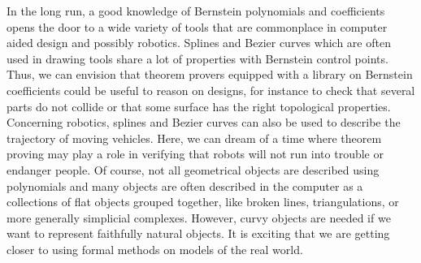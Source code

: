 \documentclass{mscs}
\begin{document}
In the long run, a good knowledge of Bernstein polynomials and
coefficients opens the door to a wide variety of tools that are
commonplace in computer aided design and possibly robotics. Splines
and Bezier curves which are often used in drawing tools share a lot of
properties with Bernstein control points. Thus, we can envision that
theorem provers equipped with a library on Bernstein coefficients
could be useful to reason on designs, for instance to check that
several parts do not collide or that some surface has the right
topological properties. Concerning robotics, splines and Bezier curves
can also be used to describe the trajectory of moving vehicles. Here,
we can dream of a time where theorem proving may play a role in
verifying that robots will not run into trouble or endanger people. Of
course, not all geometrical objects are described using polynomials
and many objects are often described in the computer as a collections
of flat objects grouped together, like broken lines, triangulations,
or more generally simplicial complexes. However, curvy objects are
needed if we want to represent faithfully natural objects. It is
exciting that we are getting closer to using formal methods on models
of the real world.


\end{document}
